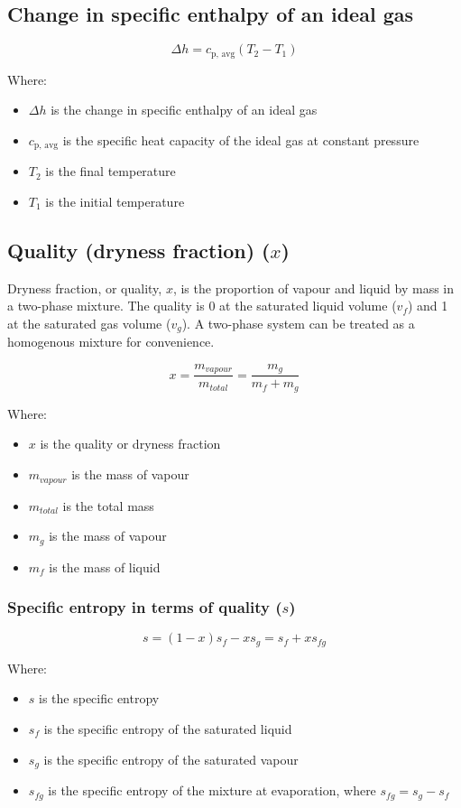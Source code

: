 \documentclass[11pt]{article}
\begin{document}
\subsection{Change in specific enthalpy of an ideal gas}
\label{sec:orgf8d708a}
\[\Delta h = c_{\text{p, avg}} (T_2 - T_1)\]

Where:
\begin{itemize}
\item \(\Delta h\) is the change in specific enthalpy of an ideal gas
\item \(c_{\text{p, avg}}\) is the specific heat capacity of the ideal gas at constant pressure
\item \(T_2\) is the final temperature
\item \(T_1\) is the initial temperature
\end{itemize}

\subsection{Quality (dryness fraction) (\(x\))}
\label{sec:org9d43f2d}
Dryness fraction, or quality, \(x\), is the proportion of vapour and liquid by mass in a two-phase mixture. The quality is 0 at the saturated liquid volume (\(v_f\)) and 1 at the saturated gas volume (\(v_g\)). A two-phase system can be treated as a homogenous mixture for convenience.

\[x = \frac{m_{vapour}}{m_{total}} = \frac{m_g}{m_f + m_g}\]

Where:
\begin{itemize}
\item \(x\) is the quality or dryness fraction
\item \(m_{vapour}\) is the mass of vapour
\item \(m_{total}\) is the total mass
\item \(m_g\) is the mass of vapour
\item \(m_f\) is the mass of liquid
\end{itemize}

\subsubsection{Specific entropy in terms of quality (\(s\))}
\label{sec:org3e1aa72}
\[s = (1 - x)s_f - xs_g = s_f + xs_{fg}\]

Where:
\begin{itemize}
\item \(s\) is the specific entropy
\item \(s_f\) is the specific entropy of the saturated liquid
\item \(s_g\) is the specific entropy of the saturated vapour
\item \(s_{fg}\) is the specific entropy of the mixture at evaporation, where \(s_{fg} = s_g - s_f\)
\end{itemize}
\end{document}
